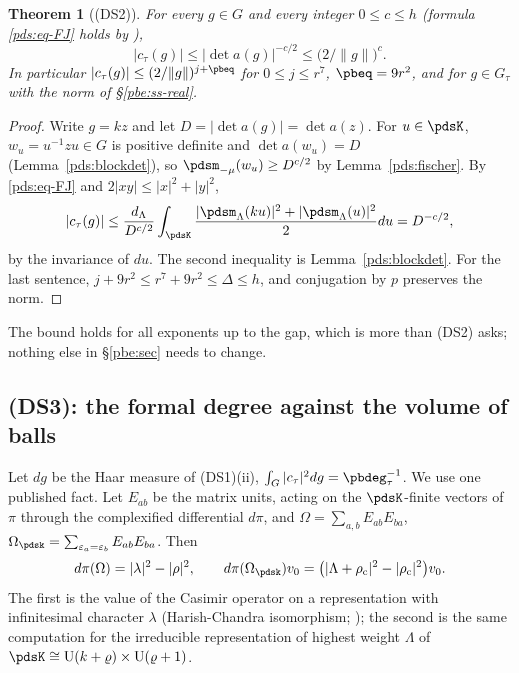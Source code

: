 \documentclass[10pt]{amsart}
\newtheorem{theorem}{Theorem}[section]
\theoremstyle{definition}
\theoremstyle{remark}
\providecommand{\auU}{\mathrm U}
\begin{document}
\begin{theorem}[\textup{(DS2)}]\label{pds:decay}
For every $g\in G$ and every integer $0\le c\le h$ (formula \eqref{pds:eq-FJ} holds by {\cite[Theorem~3.17]{P49}}),
\[
|c_\tau(g)|\le|\det a(g)|^{-c/2}\le\bigl(2/\|g\|\bigr)^c .
\]
In particular $|c_\tau(g)|\le(2/\|g\|)^{j+\pbeq}$ for $0\le j\le r^7$, $\pbeq=9r^2$, and for $g\in
G_\tau$ with the norm of \S\ref{pbe:ss-real}.
\end{theorem}
\begin{proof}
Write $g=kz$ and let $D=|\det a(g)|=\det a(z)$. For $u\in\pdsK$, $w_u=u^{-1}zu\in G$ is positive
definite and $\det a(w_u)=D$ (Lemma~\ref{pds:blockdet}), so $\pdsm_{-\mu}(w_u)\ge D^{c/2}$ by
Lemma~\ref{pds:fischer}. By \eqref{pds:eq-FJ} and $2|xy|\le|x|^2+|y|^2$,
\[
|c_\tau(g)|\le\frac{d_\Lambda}{D^{c/2}}\int_{\pdsK}\frac{|\pdsm_\Lambda(ku)|^2+|\pdsm_\Lambda(u)|^2}2du
=D^{-c/2},
\]
by the invariance of $du$. The second inequality is Lemma~\ref{pds:blockdet}. For the last
sentence, $j+9r^2\le r^7+9r^2\le\Delta\le h$, and conjugation by $p$ preserves the norm.
\end{proof}
The bound holds for all exponents up to the gap, which is more than \textup{(DS2)} asks; nothing
else in \S\ref{pbe:sec} needs to change.

\subsection{(DS3): the formal degree against the volume of balls}\label{pds:ss-ds3}

Let $dg$ be the Haar measure of \textup{(DS1)(ii)}, $\int_G|c_\tau|^2dg=\pbdeg_\tau^{-1}$. We use one
published fact. Let $E_{ab}$ be the matrix units, acting on the $\pdsK$-finite vectors of $\pi$
through the complexified differential $d\pi$, and $\Omega=\sum_{a,b}E_{ab}E_{ba}$,
$\Omega_{\pdsk}=\sum_{\varepsilon_a=\varepsilon_b}E_{ab}E_{ba}$. Then
\begin{equation}\label{pds:eq-casimir}
d\pi(\Omega)=|\lambda|^2-|\rho|^2,\qquad d\pi(\Omega_{\pdsk})v_0=\bigl(|\Lambda+\rho_{\mathrm c}|^2-
|\rho_{\mathrm c}|^2\bigr)v_0 .
\end{equation}
The first is the value of the Casimir operator on a representation with infinitesimal character
$\lambda$ (Harish-Chandra isomorphism; \cite[Theorem~8.18, (8.32)]{Knapp}); the second is the same computation for the irreducible representation of highest
weight $\Lambda$ of $\pdsK\cong\auU(k+\varrho)\times\auU(\varrho+1)$.
\end{document}
